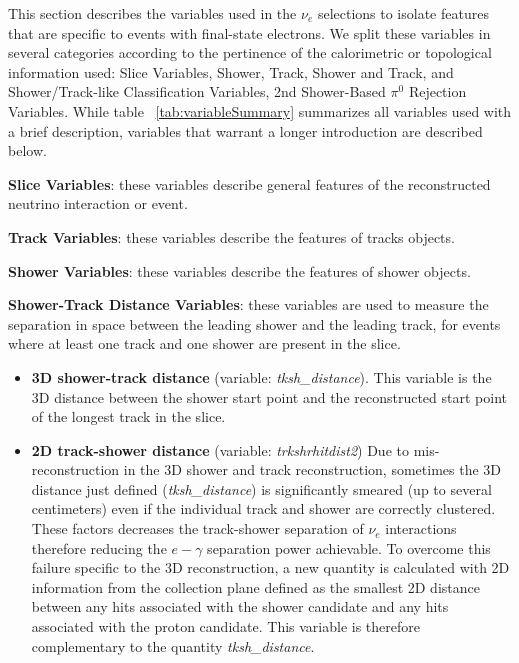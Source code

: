 \par This section describes the variables used in the $\nu_e$ selections to isolate features that are specific to events with final-state electrons. We split these variables in several categories according to the pertinence of the calorimetric or topological information used: Slice Variables, Shower, Track, Shower and Track, and Shower/Track-like  Classification Variables,  2nd Shower-Based $\pi^0$ Rejection Variables.  While table ~\ref{tab:variableSummary} summarizes all variables used with a brief description, variables that warrant a longer introduction are described below.

\par \noindent  \textbf{Slice Variables}: these variables describe general features of the reconstructed neutrino interaction or event.
\par \noindent  \textbf{Track Variables}: these variables describe the features of tracks objects.
\par \noindent \textbf{Shower Variables}:  these variables describe the features of shower objects.
\par \noindent \textbf{Shower-Track Distance Variables}: these variables are used to measure the separation in space between the leading shower and the leading track, for events where at least one track and one shower are present in the slice. 
\begin{itemize}
 \item[] \textbf{3D shower-track distance} (variable: \emph{tksh\_distance}).  This variable is the 3D distance between the shower start point and the reconstructed start point of the longest track in the slice. 
 \item[] \textbf{2D track-shower distance} (variable: \emph{trkshrhitdist2}) Due to mis-reconstruction in the 3D shower and track reconstruction, sometimes the 3D distance just defined (\emph{tksh\_distance}) is significantly smeared (up to several centimeters) even if the individual track and shower are correctly clustered. These factors decreases the track-shower separation of $\nu_e$ interactions therefore reducing the $e-\gamma$ separation power achievable. To overcome this failure specific to the 3D reconstruction, a new quantity is calculated with 2D information from the collection plane defined as the smallest 2D distance between any hits associated with the shower candidate and any hits associated with the proton candidate. This variable is therefore complementary to the quantity \emph{tksh\_distance}.
\end{itemize}



